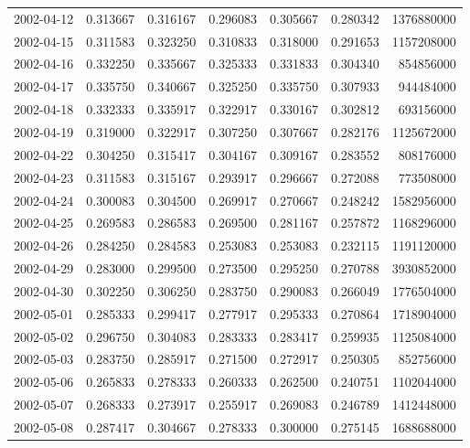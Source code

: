 \begin{tabular}{lrrrrrr}
2002-04-12 &    0.313667 &    0.316167 &    0.296083 &    0.305667 &    0.280342 &  1376880000 \\
2002-04-15 &    0.311583 &    0.323250 &    0.310833 &    0.318000 &    0.291653 &  1157208000 \\
2002-04-16 &    0.332250 &    0.335667 &    0.325333 &    0.331833 &    0.304340 &   854856000 \\
2002-04-17 &    0.335750 &    0.340667 &    0.325250 &    0.335750 &    0.307933 &   944484000 \\
2002-04-18 &    0.332333 &    0.335917 &    0.322917 &    0.330167 &    0.302812 &   693156000 \\
2002-04-19 &    0.319000 &    0.322917 &    0.307250 &    0.307667 &    0.282176 &  1125672000 \\
2002-04-22 &    0.304250 &    0.315417 &    0.304167 &    0.309167 &    0.283552 &   808176000 \\
2002-04-23 &    0.311583 &    0.315167 &    0.293917 &    0.296667 &    0.272088 &   773508000 \\
2002-04-24 &    0.300083 &    0.304500 &    0.269917 &    0.270667 &    0.248242 &  1582956000 \\
2002-04-25 &    0.269583 &    0.286583 &    0.269500 &    0.281167 &    0.257872 &  1168296000 \\
2002-04-26 &    0.284250 &    0.284583 &    0.253083 &    0.253083 &    0.232115 &  1191120000 \\
2002-04-29 &    0.283000 &    0.299500 &    0.273500 &    0.295250 &    0.270788 &  3930852000 \\
2002-04-30 &    0.302250 &    0.306250 &    0.283750 &    0.290083 &    0.266049 &  1776504000 \\
2002-05-01 &    0.285333 &    0.299417 &    0.277917 &    0.295333 &    0.270864 &  1718904000 \\
2002-05-02 &    0.296750 &    0.304083 &    0.283333 &    0.283417 &    0.259935 &  1125084000 \\
2002-05-03 &    0.283750 &    0.285917 &    0.271500 &    0.272917 &    0.250305 &   852756000 \\
2002-05-06 &    0.265833 &    0.278333 &    0.260333 &    0.262500 &    0.240751 &  1102044000 \\
2002-05-07 &    0.268333 &    0.273917 &    0.255917 &    0.269083 &    0.246789 &  1412448000 \\
2002-05-08 &    0.287417 &    0.304667 &    0.278333 &    0.300000 &    0.275145 &  1688688000 \\

\end{tabular}
